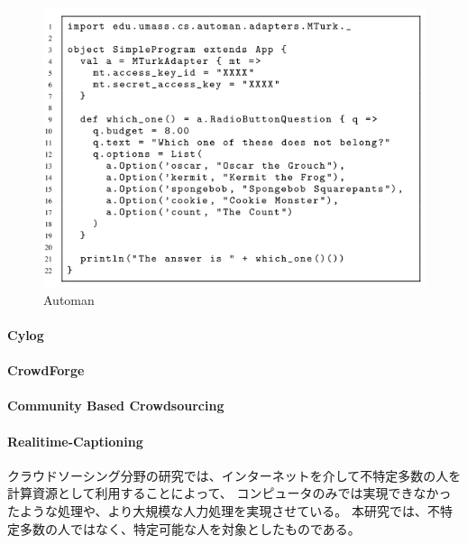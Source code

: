 \begin{figure}[htbp]
  \begin{center}
  \includegraphics[width=.6\linewidth,bb=0 0 552 404]{images/automan.png}
  \end{center}
  \caption{Automan}
  \label{fig:automan}
\end{figure}

\paragraph{Cylog}\label{cylog}

\mbox{}

\cite{cylog}

\paragraph{CrowdForge}\label{crowdforge}

\mbox{}

\cite{crowdforge}

\paragraph{Community Based
Crowdsourcing}\label{community-based-crowdsourcing}

\mbox{}

\cite{community-based-crowdsourcing}

\paragraph{Realitime-Captioning}\label{realitime-captioning}

\mbox{}

\cite{realtime-captioning}

クラウドソーシング分野の研究では、インターネットを介して不特定多数の人を計算資源として利用することによって、
コンピュータのみでは実現できなかったような処理や、より大規模な人力処理を実現させている。
本研究では、不特定多数の人ではなく、特定可能な人を対象としたものである。

